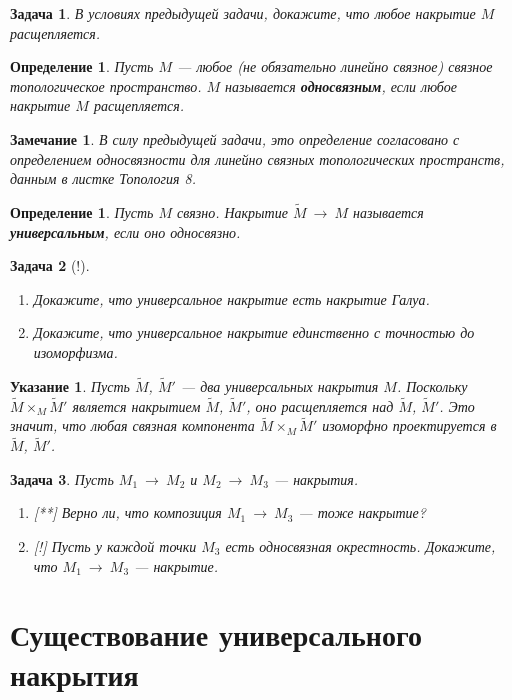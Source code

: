 \documentclass[12pt]{book}
\newcommand{\subs}{\section}
\newcommand{\arrow}{{\:\longrightarrow\:}}
\theoremstyle{upshape}
\newtheorem{zadacha}{Задача}[chapter]
\theoremstyle{generic}
\newtheorem{opredelenie}[teorema]{Определение}
\def\еза{\end{remark}}
\theoremstyle{upshapenonumber}
\newtheorem{ukazanie}{Указание}[section]
\newtheorem{zamechanie}{Замечание}[chapter]
\newcommand{\следствие}{%
     \refstepcounter{teorema}
     {\noindent\bf Следствие \thechapter.\arabic{teorema}:\ }}
\newcommand{\пример}{%
     \refstepcounter{teorema}
     {\noindent\bf Пример \thechapter.\arabic{teorema}:\ }}
\newcommand{\лемма}{%
     \refstepcounter{teorema}
     {\noindent\bf Лемма \thechapter.\arabic{teorema}:\ }}
\newcommand{\теорема}{%
     \refstepcounter{teorema}
     {\noindent\bf Теорема \thechapter.\arabic{teorema}:\ }}
\newcommand{\утверждение}{%
     \refstepcounter{teorema}
     {\noindent\bf Утверждение \thechapter.\arabic{teorema}:\ }}
\def\ем{\em}
\def\ит{\it}
\def\ез{\end{zadacha}}
\def\еу{\end{ukazanie}}
\def\ео{\end{opredelenie}}
\def\енум{\begin{enumerate}}
\def\ее{\end{enumerate}}
\def\итем{\item %
}
\begin{document}
{\begin{zadacha}
В условиях предыдущей задачи, докажите, что
любое накрытие $M$ расщепляется.
\end{zadacha}

\begin{opredelenie}
Пусть $M$ --- любое (не обязательно линейно связное)
связное топологическое пространство. $M$ 
называется {\bf односвязным}, если 
любое накрытие $M$ расщепляется.
\end{opredelenie}

\begin{zamechanie} 
В силу предыдущей задачи, это определение
согласовано с определением односвязности
для линейно связных топологических пространств,
данным в листке Топология 8.
\end{zamechanie}

\begin{opredelenie}
Пусть $M$ связно.
Накрытие $\tilde M \arrow M$ 
называется {\bf универсальным}, если оно односвязно.
\end{opredelenie}

\begin{zadacha}[!] 
\енум
\итем Докажите, что 
универсальное накрытие есть накрытие Галуа.
\итем Докажите, что универсальное накрытие единственно
с точностью до изоморфизма.
\ее
\end{zadacha}

\begin{ukazanie} Пусть $\tilde M$, $\tilde M'$ --- два
универсальных накрытия $M$. Поскольку 
$\tilde M\times_M\tilde M'$ является накрытием
$\tilde M$, $\tilde M'$, оно расщепляется над $\tilde M$,
$\tilde M'$. Это значит, что любая связная компонента
$\tilde M\times_M\tilde M'$ изоморфно проектируется в 
$\tilde M$, $\tilde M'$.
\end{ukazanie}


\begin{zadacha}
Пусть $M_1\arrow M_2$ и $M_2\arrow M_3$ --- накрытия.
\begin{enumerate}
\итем[**] Верно ли, что композиция $M_1\arrow M_3$ --- тоже накрытие?

\итем[!] Пусть у каждой точки $M_3$ есть односвязная окрестность.
Докажите, что  $M_1\arrow M_3$ --- накрытие.
\end{enumerate}
\end{zadacha}


\subs{Существование универсального накрытия}

}
\end{document}
